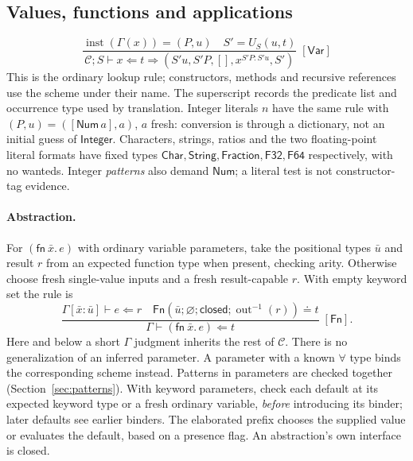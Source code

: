 \documentclass[11pt]{article}
\theoremstyle{definition}
\newcommand{\pack}{\operatorname{out}}
\newcommand{\Fn}{\mathsf{Fn}}
\newcommand{\Int}{\mathsf{Integer}}
\newcommand{\Str}{\mathsf{String}}
\newcommand{\eqs}{\doteq}
\newcommand{\chk}{\mathrel{\Leftarrow}}
\newcommand{\rrule}[3]{\frac{\displaystyle #2}{\displaystyle #3}
                       \;{\scriptstyle[\textsf{#1}]}}
\begin{document}
\subsection{Values, functions and applications}
\[
 \rrule{Var}{\operatorname{inst}(\Gamma(x))=(P,u)
                  \quad S'=U_S(u,t)}
            {\mathcal C;S\vdash x\chk t
              \Longrightarrow(S'u,S'P,[],x^{S'P:S'u},S')}
\]
This is the ordinary lookup rule; constructors, methods and recursive
references use the scheme under their name. The superscript records the
predicate list and occurrence type used by translation. Integer literals
$n$ have the same rule with $(P,u)=([\mathsf{Num}\,a],a)$, $a$ fresh:
conversion is through a dictionary, not an initial guess of $\Int$.
Characters, strings, ratios and the two floating-point literal formats
have fixed types $\mathsf{Char},\Str,\mathsf{Fraction},\mathsf{F32},
\mathsf{F64}$ respectively, with no wanteds. Integer \emph{patterns}
also demand $\mathsf{Num}$; a literal test is not constructor-tag evidence.

\paragraph{Abstraction.}
For $(\mathsf{fn}\ \bar x.\,e)$ with ordinary variable parameters, take
the positional types $\bar u$ and result $r$ from an expected function
type when present, checking arity. Otherwise choose fresh single-value
inputs and a fresh result-capable $r$. With empty keyword set the rule is
\[
 \rrule{Fn}{\Gamma[\bar x:\bar u]\vdash e\chk r
               \quad \Fn(\bar u;\varnothing;\mathsf{closed};\pack^{-1}(r))
                      \eqs t}
            {\Gamma\vdash(\mathsf{fn}\ \bar x.\,e)\chk t}.
\]
Here and below a short $\Gamma$ judgment inherits the rest of $\mathcal C$.
There is no generalization of an inferred parameter. A parameter with a
known $\forall$ type binds the corresponding scheme instead. Patterns in
parameters are checked together (Section~\ref{sec:patterns}). With keyword
parameters, check each default at its expected keyword type or a fresh
ordinary variable, \emph{before} introducing its binder; later defaults see
earlier binders. The elaborated prefix chooses the supplied value or
evaluates the default, based on a presence flag. An abstraction's own
interface is closed.
\end{document}
